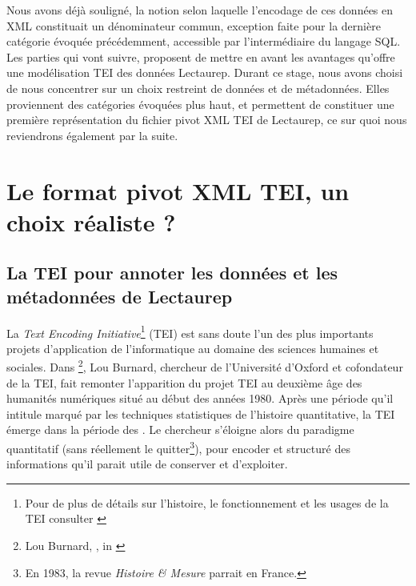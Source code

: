 Nous avons déjà souligné, la notion selon laquelle l'encodage de ces données en XML constituait un dénominateur commun, exception faite pour la dernière catégorie évoquée précédemment, accessible par l'intermédiaire du langage SQL. Les parties qui vont suivre, proposent de mettre en avant les avantages qu'offre une modélisation TEI des données Lectaurep. Durant ce stage, nous avons choisi de nous concentrer sur un choix restreint de données et de métadonnées. Elles proviennent des catégories évoquées plus haut, et permettent de constituer une première représentation du fichier pivot XML TEI de Lectaurep, ce sur quoi nous reviendrons également par la suite. 

\section{Le format pivot XML TEI, un choix réaliste ?}
\subsection{La TEI pour annoter les données et les métadonnées de Lectaurep}

La \textit{Text Encoding Initiative}\footnote{Pour de plus de détails sur l'histoire, le fonctionnement et les usages de la TEI consulter \cite{burnard_quest-ce_2015}} (TEI) est sans doute l'un des plus importants projets d'application de l'informatique au domaine des sciences humaines et sociales. Dans \footnote{Lou Burnard, , in \cite{mounier_dir_readwrite_2012}}, Lou Burnard, chercheur de l'Université d'Oxford et cofondateur de la TEI, fait remonter l'apparition du projet TEI au deuxième âge des humanités numériques situé au début des années 1980.  Après une période qu'il intitule  marqué par les techniques statistiques de l'histoire quantitative, la TEI émerge dans la période des . Le chercheur s'éloigne alors du paradigme quantitatif (sans réellement le quitter\footnote{En 1983, la revue \textit{Histoire \& Mesure} parrait en France.}), pour encoder et structuré des informations qu'il parait utile de conserver et d'exploiter.

